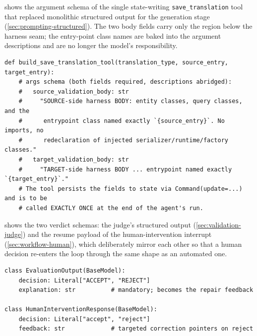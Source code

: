  shows the argument schema of the single state-writing
\texttt{save\_translation} tool that replaced monolithic structured output for the
generation stage (\cref{sec:prompting-structured}). The two body fields carry only the
region below the harness seam; the entry-point class names are baked into the argument
descriptions and are no longer the model's responsibility.

\begin{listing}[H]
\begin{verbatim}
def build_save_translation_tool(translation_type, source_entry, target_entry):
    # args schema (both fields required, descriptions abridged):
    #   source_validation_body: str
    #     "SOURCE-side harness BODY: entity classes, query classes, and the
    #      entrypoint class named exactly `{source_entry}`. No imports, no
    #      redeclaration of injected serializer/runtime/factory classes."
    #   target_validation_body: str
    #     "TARGET-side harness BODY ... entrypoint named exactly `{target_entry}`."
    # The tool persists the fields to state via Command(update=...) and is to be
    # called EXACTLY ONCE at the end of the agent's run.
\end{verbatim}
\caption{The \texttt{save\_translation} tool contract (abridged from \texttt{react\_agent/translation\_draft.py}).}
\label{lst:app-save-tool}
\end{listing}

 shows the two verdict schemas: the judge's structured output
(\cref{sec:validation-judge}) and the resume payload of the human-intervention
interrupt (\cref{sec:workflow-human}), which deliberately mirror each other so that a
human decision re-enters the loop through the same shape as an automated one.

\begin{listing}[H]
\begin{verbatim}
class EvaluationOutput(BaseModel):
    decision: Literal["ACCEPT", "REJECT"]
    explanation: str          # mandatory; becomes the repair feedback

class HumanInterventionResponse(BaseModel):
    decision: Literal["accept", "reject"]
    feedback: str             # targeted correction pointers on reject
\end{verbatim}
\caption{The judge and human-intervention verdict schemas.}
\label{lst:app-verdicts}
\end{listing}

